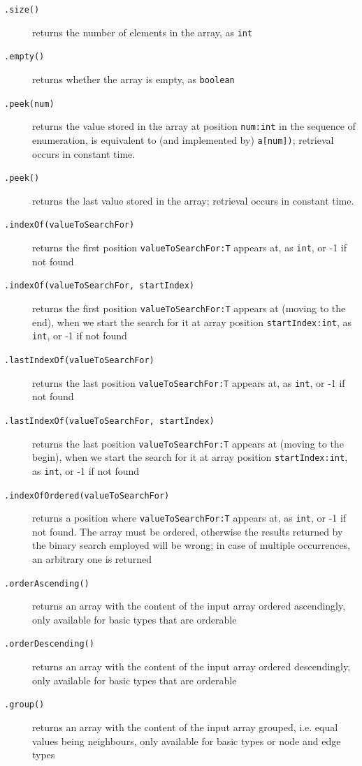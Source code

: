 \begin{description}
\item[\texttt{.size()}] returns the number of elements in the array, as \texttt{int}
\item[\texttt{.empty()}] returns whether the array is empty, as \texttt{boolean}
\item[\texttt{.peek(num)}] returns the value stored in the array at position \texttt{num:int} in the sequence of enumeration, is equivalent to (and implemented by) \texttt{a[num])}; retrieval occurs in constant time.
\item[\texttt{.peek()}] returns the last value stored in the array; retrieval occurs in constant time.
\item[\texttt{.indexOf(valueToSearchFor)}] returns the first position \texttt{valueToSearchFor:T} appears at, as \texttt{int}, or -1 if not found
\item[\texttt{.indexOf(valueToSearchFor, startIndex)}] returns the first position \texttt{valueToSearchFor:T} appears at (moving to the end), when we start the search for it at array position \texttt{startIndex:int}, as \texttt{int}, or -1 if not found
\item[\texttt{.lastIndexOf(valueToSearchFor)}] returns the last position \texttt{valueToSearchFor:T} appears at, as \texttt{int}, or -1 if not found
\item[\texttt{.lastIndexOf(valueToSearchFor, startIndex)}] returns the last position \texttt{valueToSearchFor:T} appears at (moving to the begin), when we start the search for it at array position \texttt{startIndex:int}, as \texttt{int}, or -1 if not found
\item[\texttt{.indexOfOrdered(valueToSearchFor)}] returns a position where \texttt{valueToSearchFor:T} appears at, as \texttt{int}, or -1 if not found. The array must be ordered, otherwise the results returned by the binary search employed will be wrong; in case of multiple occurrences, an arbitrary one is returned
\item[\texttt{.orderAscending()}] returns an array with the content of the input array ordered ascendingly, only available for basic types that are orderable
\item[\texttt{.orderDescending()}] returns an array with the content of the input array ordered descendingly, only available for basic types that are orderable
\item[\texttt{.group()}] returns an array with the content of the input array grouped, i.e. equal values being neighbours, only available for basic types or node and edge types

\end{description}
